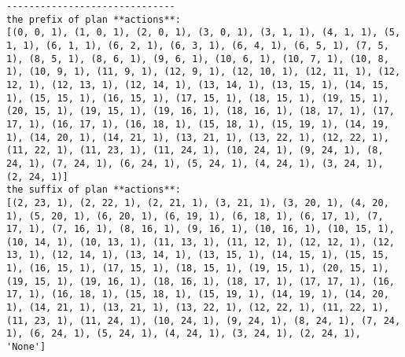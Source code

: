 \begin{lstlisting}
------------------------------
the prefix of plan **actions**:
[(0, 0, 1), (1, 0, 1), (2, 0, 1), (3, 0, 1), (3, 1, 1), (4, 1, 1), (5, 1, 1), (6, 1, 1), (6, 2, 1), (6, 3, 1), (6, 4, 1), (6, 5, 1), (7, 5, 1), (8, 5, 1), (8, 6, 1), (9, 6, 1), (10, 6, 1), (10, 7, 1), (10, 8, 1), (10, 9, 1), (11, 9, 1), (12, 9, 1), (12, 10, 1), (12, 11, 1), (12, 12, 1), (12, 13, 1), (12, 14, 1), (13, 14, 1), (13, 15, 1), (14, 15, 1), (15, 15, 1), (16, 15, 1), (17, 15, 1), (18, 15, 1), (19, 15, 1), (20, 15, 1), (19, 15, 1), (19, 16, 1), (18, 16, 1), (18, 17, 1), (17, 17, 1), (16, 17, 1), (16, 18, 1), (15, 18, 1), (15, 19, 1), (14, 19, 1), (14, 20, 1), (14, 21, 1), (13, 21, 1), (13, 22, 1), (12, 22, 1), (11, 22, 1), (11, 23, 1), (11, 24, 1), (10, 24, 1), (9, 24, 1), (8, 24, 1), (7, 24, 1), (6, 24, 1), (5, 24, 1), (4, 24, 1), (3, 24, 1), (2, 24, 1)]
the suffix of plan **actions**:
[(2, 23, 1), (2, 22, 1), (2, 21, 1), (3, 21, 1), (3, 20, 1), (4, 20, 1), (5, 20, 1), (6, 20, 1), (6, 19, 1), (6, 18, 1), (6, 17, 1), (7, 17, 1), (7, 16, 1), (8, 16, 1), (9, 16, 1), (10, 16, 1), (10, 15, 1), (10, 14, 1), (10, 13, 1), (11, 13, 1), (11, 12, 1), (12, 12, 1), (12, 13, 1), (12, 14, 1), (13, 14, 1), (13, 15, 1), (14, 15, 1), (15, 15, 1), (16, 15, 1), (17, 15, 1), (18, 15, 1), (19, 15, 1), (20, 15, 1), (19, 15, 1), (19, 16, 1), (18, 16, 1), (18, 17, 1), (17, 17, 1), (16, 17, 1), (16, 18, 1), (15, 18, 1), (15, 19, 1), (14, 19, 1), (14, 20, 1), (14, 21, 1), (13, 21, 1), (13, 22, 1), (12, 22, 1), (11, 22, 1), (11, 23, 1), (11, 24, 1), (10, 24, 1), (9, 24, 1), (8, 24, 1), (7, 24, 1), (6, 24, 1), (5, 24, 1), (4, 24, 1), (3, 24, 1), (2, 24, 1), 'None']
\end{lstlisting} 


